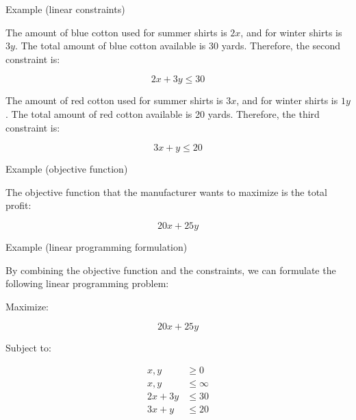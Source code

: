 \documentclass{beamer}
\begin{document}
\begin{frame}{Example (linear constraints)}

    The amount of blue cotton used for summer shirts is $2x$, and for winter shirts is $3y$. The total amount of blue cotton available is 30 yards. Therefore, the second constraint is:

    \begin{equation}
        2x + 3y \leq 30
    \end{equation}

    The amount of red cotton used for summer shirts is $3x$, and for winter shirts is $1y$. The total amount of red cotton available is 20 yards. Therefore, the third constraint is:

    \begin{equation}
        3x + y \leq 20
    \end{equation}

\end{frame}

\begin{frame}{Example (objective function)}

    The objective function that the manufacturer wants to maximize is the total profit:

    \begin{equation}
        20x + 25y
    \end{equation}

\end{frame}

\begin{frame}{Example (linear programming formulation)}

    By combining the objective function and the constraints, we can formulate the following linear programming problem:

    Maximize:

    \begin{equation}
        20x + 25y
    \end{equation}

    Subject to:

    \begin{align}
        x, y &\geq 0 \\
        x, y &\leq \infty \\
        2x + 3y &\leq 30 \\
        3x + y &\leq 20 \\
    \end{align}

\end{frame}
\end{document}
